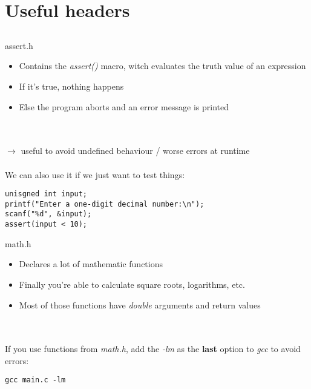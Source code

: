\section{Useful headers}
\subsection{}
\begin{frame}[fragile]{assert.h}
	 \begin{itemize}
	 	\item Contains the \textit{assert()} macro, witch evaluates the truth value of an expression
	 	\item If it's true, nothing happens
	 	\item Else the program aborts and an error message is printed
	 \end{itemize} \ \\ \ \\
	 $\rightarrow$ useful to avoid undefined behaviour / worse errors at runtime \\ \ \\
	 We can also use it if we just want to test things:
	 \begin{lstlisting}[numbers=none]
unisgned int input;
printf("Enter a one-digit decimal number:\n");
scanf("%d", &input);
assert(input < 10);
\end{lstlisting}
\end{frame}
\begin{frame}[fragile]{math.h}
	\begin{itemize}
		\item Declares a lot of mathematic functions
		\item Finally you're able to calculate square roots, logarithms, etc.
		\item Most of those functions have \textit{double} arguments and return values
	\end{itemize} \ \\ \ \\
	If you use functions from \textit{math.h}, add the \textit{-lm} as the \textbf{last} option to \textit{gcc} to avoid errors:
	\begin{lstlisting}[numbers=none]
gcc main.c -lm
\end{lstlisting}
\end{frame}
